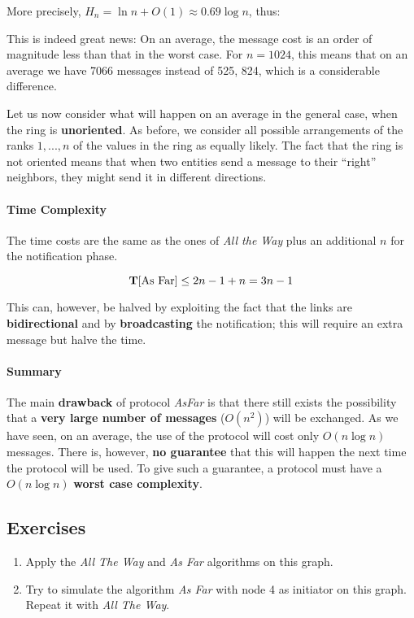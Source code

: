 More precisely, $H_n = \ln n + O(1) \approx 0.69 \log n$, thus:


This is indeed great news: On an average, the message cost is an order of magnitude less than that in the worst case. For $n = 1024$, this means that on an average we have 7066 messages instead of 525, 824, which is a considerable difference.

Let us now consider what will happen on an average in the general case, when the ring is \textbf{unoriented}. As before, we consider all possible arrangements of the ranks $1,...,n$ of the values in the ring as equally likely. The fact that the ring is not oriented means that when two entities send a message to their “right” neighbors, they might send it in different directions.


\paragraph{Time Complexity} The time costs are the same as the ones of \textit{All the Way} plus an additional $n$ for the notification phase.

$$
\mathbf{T}[\text{As Far}] \leq 2n - 1 + n = 3n-1
$$

This can, however, be halved by exploiting the fact that the links are \textbf{bidirectional} and by \textbf{broadcasting} the notification; this will require an extra message but halve the time.

\paragraph{Summary} The main \textbf{drawback} of protocol \textit{AsFar} is that there still exists the possibility that a \textbf{very large number of messages} ($O(n^2)$) will be exchanged. As we have seen, on an average, the use of the protocol will cost only $O(n \log n)$ messages. There is, however, \textbf{no guarantee} that this will happen the next time the protocol will be used. To give such a guarantee, a protocol must have a $O(n \log n)$ \textbf{worst case complexity}.

\newpage
\subsection{Exercises}
\begin{enumerate}
    \item Apply the \textit{All The Way} and \textit{As Far} algorithms on this graph.
    \item Try to simulate the algorithm \textit{As Far} with node 4 as initiator on this graph. Repeat it with \textit{All The Way}.
\end{enumerate}